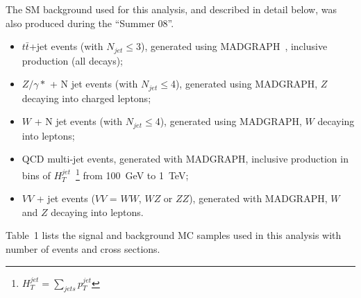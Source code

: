 \documentclass{cmspaper}
\begin{document}
\begin{linenumbers}
The SM background used for this analysis, and described in detail below,
was also produced during the ``Summer 08''.
\begin{itemize}
%
\item $t\bar{t}$+jet events (with $N_{jet}\le$3), generated using MADGRAPH~\cite{MADGRAPH}, inclusive production (all decays); 
%
\item $Z/\gamma*$ + N jet events (with $N_{jet}\le$4), generated using MADGRAPH, $Z$ decaying into charged leptons;  
%
\item $W$ + N jet events (with $N_{jet}\le$4), generated using MADGRAPH, $W$ decaying into leptons; 
%
\item QCD multi-jet events, generated with MADGRAPH, inclusive production in 
bins of $H_{T}^{jet}$~\footnote{$H_{T}^{jet}=\sum_{jets} p_T^{jet}$} from 100~GeV to 1~TeV;  
%
%
\item $VV$ + jet events ($VV$ = $WW$, $WZ$ or $ZZ$), generated with MADGRAPH, 
$W$ and $Z$ decaying into leptons.
\end{itemize} 

Table~1
lists the signal and background MC samples used in this analysis with 
number of events and cross sections.


\end{linenumbers}
\end{document}
